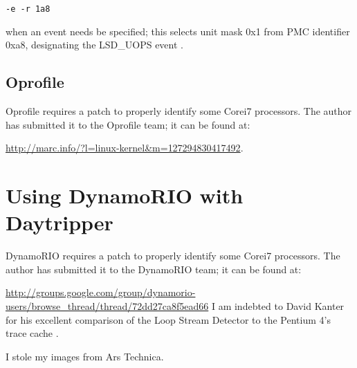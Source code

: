 \documentclass[]{sigplanconf}
\begin{document}
\vspace{5mm}
\texttt{-e -r 1a8}
\vspace{5mm}

when an event needs be specified; this selects unit mask 0x1 from PMC identifier
0xa8, designating the LSD\_UOPS event \cite{intelsys}.
\subsection{Oprofile}
Oprofile requires a patch to properly identify some Core\texttrademark i7
processors. The author has submitted it to the Oprofile team; it can be found
at:

\url{http://marc.info/?l=linux-kernel&m=127294830417492}.
\section{Using DynamoRIO with Daytripper}
DynamoRIO requires a patch to properly identify some Core\texttrademark i7
processors. The author has submitted it to the DynamoRIO team; it can be found
at:

\url{http://groups.google.com/group/dynamorio-users/browse_thread/thread/72dd27ca8f5ead66}
\acks
I am indebted to David Kanter for his excellent comparison of the Loop Stream
Detector to the Pentium 4's trace cache \cite{kanter}.

I stole my images from Ars Technica.



\end{document}
